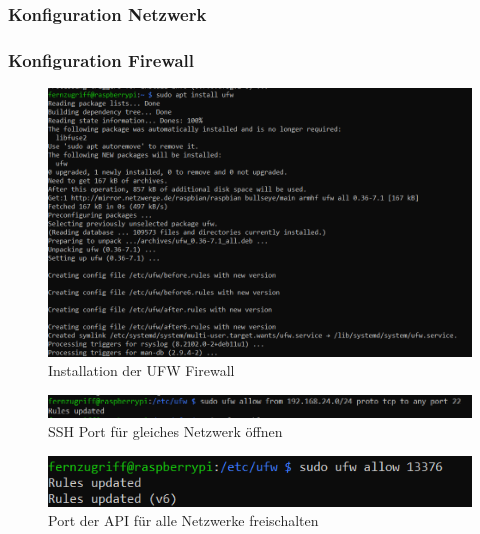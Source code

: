 \documentclass[a4paper, 11pt]{scrartcl}
\begin{document}
\subsubsection{Konfiguration Netzwerk}




\subsubsection{Konfiguration Firewall}
\begin{figure}[H]
    \begin{center}
        \includegraphics[scale=0.7]{Bilder/install_firewall.png}
        \caption{Installation der UFW Firewall}\label{pic:install_firewall}
    \end{center}
\end{figure}

\begin{figure}[H]
    \begin{center}
        \includegraphics[scale=0.7]{Bilder/allow_ssh_from_network.png}
        \caption{SSH Port für gleiches Netzwerk öffnen}\label{pic:ssh_port_allow}
    \end{center}
\end{figure}

\begin{figure}[H]
    \begin{center}
        \includegraphics[scale=0.7]{Bilder/ufw_allow_api.png}
        \caption{Port der API für alle Netzwerke freischalten}\label{pic:api_port_allow}
    \end{center}
\end{figure}
\end{document}
